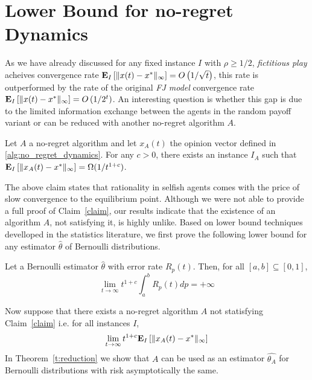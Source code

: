 \section{Lower Bound for no-regret Dynamics}
As we have already discussed for any fixed instance $I$ with $\rho\geq 1/2$, \emph{fictitious play} acheives convergence rate $\bm{\mathrm{E}}_{I} \left[ \| x(t)-x^* \|_{\infty} \right]=O\left(1/\sqrt{t}\right)$, this rate is outperformed by
the rate of the original \emph{FJ model} convergence rate $\bm{\mathrm{E}}_{I} \left[ \| x(t)-x^* \|_{\infty} \right]=O\left(1/2^{t}\right)$. An interesting question is whether this gap
is due to the limited information exchange between the agents in the random payoff variant or can be reduced with another no-regret algorithm $A$.

\begin{claim}\label{claim}
Let $A$ a no-regret algorithm and let $x_A(t)$ the opinion vector defined in \ref{alg:no_regret_dynamics}.
For any $c>0$, there exists an instance $I_A$ such that $\bm{\mathrm{E}}_{I} \left[ \| x_A(t)-x^* \|_{\infty} \right] = \Omega(1/t^{1+c})$.
\end{claim}


The above claim states that rationality in selfish agents comes with the price of slow convergence to the equilibrium point.
Although we were not able to provide a full proof of Claim~\ref{claim}, our results indicate that
the existence of an algorithm $A$, not satisfying it, is highly unlike. Based on lower bound techniques develloped
in the statistics literature, we first prove the following lower bound for any estimator $\hat{\theta}$ of Bernoulli distributions.

\begin{theorem}\label{t:integral}
Let a Bernoulli estimator $\hat{\theta}$ with error rate $R_p(t)$. Then, for all $[a,b] \subseteq [0,1]$,
\[ \lim_{t \to \infty}t^{1+c} \int_{a}^{b}R_p(t)dp = +\infty\]
\end{theorem}

\noindent Now suppose that there exists a no-regret algorithm $A$ not statisfying Claim~\ref{claim} i.e. for all instances $I$, \[\lim_{t\rightarrow \infty}t^{1+c}\bm{\mathrm{E}}_{I} \left[ \| x_A(t)-x^* \|_{\infty} \right]\]
In Theorem~\ref{t:reduction} we show that $A$ can be used as an estimator $\hat{\theta_A}$ for Bernoulli distributions with risk asymptotically the same.

